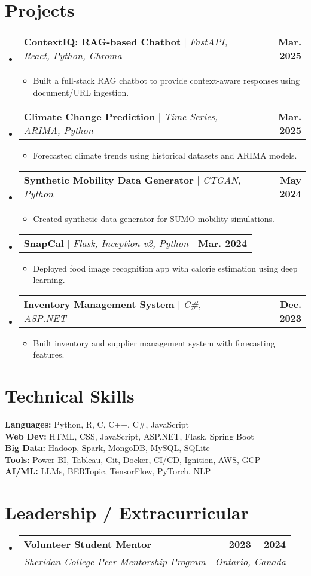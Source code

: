 \documentclass[letterpaper,11pt]{article}
\makeatletter
\newcommand{\resumeItem}[1]{\item\small{{#1 \vspace{-2pt}}}}
\newcommand{\resumeSubheading}[4]{\vspace{-2pt}\item
    \begin{tabular*}{1.0\textwidth}[t]{l@{\extracolsep{\fill}}r}
      \textbf{#1} & \textbf{\small #2} \\
      \textit{\small#3} & \textit{\small #4} \\
    \end{tabular*}\vspace{-7pt}}
\newcommand{\resumeProjectHeading}[2]{\item
    \begin{tabular*}{1.001\textwidth}{l@{\extracolsep{\fill}}r}
      \small#1 & \textbf{\small #2}\\
    \end{tabular*}\vspace{-7pt}}
\newcommand{\resumeItemListStart}{\begin{itemize}}
\newcommand{\resumeItemListEnd}{\end{itemize}\vspace{-5pt}}
\newcommand{\resumeSubHeadingListStart}{\begin{itemize}[leftmargin=0.0in, label={}]}
\newcommand{\resumeSubHeadingListEnd}{\end{itemize}}
\makeatother
\begin{document}
\section{Projects}
  \resumeSubHeadingListStart
    \resumeProjectHeading
      {\textbf{ContextIQ: RAG-based Chatbot} $|$ \emph{FastAPI, React, Python, Chroma}}{Mar. 2025}
      \resumeItemListStart
        \resumeItem{Built a full-stack RAG chatbot to provide context-aware responses using document/URL ingestion.}
      \resumeItemListEnd

    \resumeProjectHeading
      {\textbf{Climate Change Prediction} $|$ \emph{Time Series, ARIMA, Python}}{Mar. 2025}
      \resumeItemListStart
        \resumeItem{Forecasted climate trends using historical datasets and ARIMA models.}
      \resumeItemListEnd

    \resumeProjectHeading
      {\textbf{Synthetic Mobility Data Generator} $|$ \emph{CTGAN, Python}}{May 2024}
      \resumeItemListStart
        \resumeItem{Created synthetic data generator for SUMO mobility simulations.}
      \resumeItemListEnd

    \resumeProjectHeading
      {\textbf{SnapCal} $|$ \emph{Flask, Inception v2, Python}}{Mar. 2024}
      \resumeItemListStart
        \resumeItem{Deployed food image recognition app with calorie estimation using deep learning.}
      \resumeItemListEnd

    \resumeProjectHeading
      {\textbf{Inventory Management System} $|$ \emph{C\#, ASP.NET}}{Dec. 2023}
      \resumeItemListStart
        \resumeItem{Built inventory and supplier management system with forecasting features.}
      \resumeItemListEnd
  \resumeSubHeadingListEnd

\section{Technical Skills}
 \begin{itemize}[leftmargin=0.15in, label={}]
  \small{\item{
   \textbf{Languages:} Python, R, C, C++, C\#, JavaScript \\
   \textbf{Web Dev:} HTML, CSS, JavaScript, ASP.NET, Flask, Spring Boot \\
   \textbf{Big Data:} Hadoop, Spark, MongoDB, MySQL, SQLite \\
   \textbf{Tools:} Power BI, Tableau, Git, Docker, CI/CD, Ignition, AWS, GCP \\
   \textbf{AI/ML:} LLMs, BERTopic, TensorFlow, PyTorch, NLP 
  }}
 \end{itemize}

\section{Leadership / Extracurricular}
  \resumeSubHeadingListStart
    \resumeSubheading
      {Volunteer Student Mentor}{2023 -- 2024}
      {Sheridan College Peer Mentorship Program}{Ontario, Canada}
  \resumeSubHeadingListEnd
\end{document}
